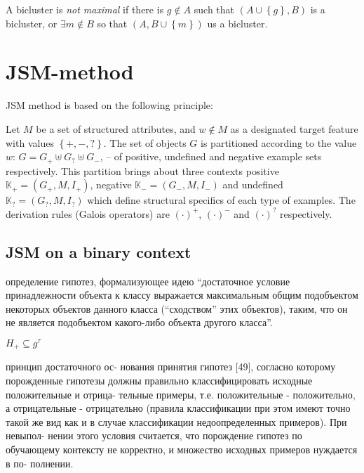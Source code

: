 \documentclass[a4paper]{article}
\newcommand{\obj}[1]{{\left\{ #1 \right \}}}
\newcommand{\brac}[1]{{\left ( #1 \right )}}
\newcommand{\Ctx}{\mathbb{K}}
\begin{document}
A bicluster is \emph{not maximal} if there is $g\notin A$ such that $\brac{A\cup\obj{g},B}$ is a bicluster, or $\exists m\notin B$ so that $\brac{A,B\cup\obj{m}}$ us a bicluster.



\section{JSM-method} %
\label{sec:dsm_method}

JSM method is based on the following principle: %

Let $M$ be a set of structured attributes, and $w\notin M$ as a designated target feature with values $\obj{+,-,?}$. The set of objects $G$ is partitioned according to the value $w$: $G=G_+\uplus G_? \uplus G_-$, -- of positive, undefined and negative example sets respectively. This partition brings about three contexts positive $\Ctx_+ = \brac{G_+,M,I_+}$, negative $\Ctx_- = \brac{G_-,M,I_-}$ and undefined $\Ctx_? = \brac{G_?,M,I_?}$ which define structural specifics of each type of examples. The derivation rules (Galois operators) are ${(\cdot)}^+$, ${(\cdot)}^-$ and ${(\cdot)}^?$ respectively.




\subsection{JSM on a binary context} %
\label{sub:dsm_on_a_binary_context}

определение гипотез, формализующее идею “достаточное условие принадлежности объекта к классу выражается максимальным общим подобъектом некоторых объектов данного класса (“сходством” этих объектов), таким, что он не является подобъектом какого-либо объекта другого класса”.

$H_+\subseteq g^\tau$

принцип достаточного ос-
нования принятия гипотез [49], согласно которому порожденные гипотезы
должны правильно классифицировать исходные положительные и отрица-
тельные примеры, т.е. положительные - положительно, а отрицательные -
отрицательно (правила классификации при этом имеют точно такой же вид
как и в случае классификации недоопределенных примеров). При невыпол-
нении этого условия считается, что порождение гипотез по обучающему
контексту не корректно, и множество исходных примеров нуждается в по-
полнении.
\end{document}

